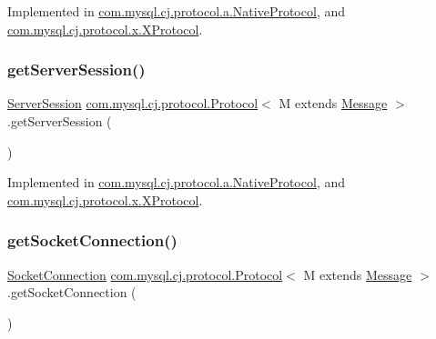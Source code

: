 Implemented in \mbox{\hyperlink{classcom_1_1mysql_1_1cj_1_1protocol_1_1a_1_1_native_protocol_a6bb695c2fd2b3492490208c56b23ebd4}{com.\+mysql.\+cj.\+protocol.\+a.\+Native\+Protocol}}, and \mbox{\hyperlink{classcom_1_1mysql_1_1cj_1_1protocol_1_1x_1_1_x_protocol_a42d0005d5123c6c54913d499ab69fbf5}{com.\+mysql.\+cj.\+protocol.\+x.\+X\+Protocol}}.

\mbox{\label{interfacecom_1_1mysql_1_1cj_1_1protocol_1_1_protocol_a1dade0f0b8da9ec87055ff8b86323bd3}} 
\subsubsection{\texorpdfstring{get\+Server\+Session()}{getServerSession()}}
{\footnotesize\ttfamily \mbox{\hyperlink{interfacecom_1_1mysql_1_1cj_1_1protocol_1_1_server_session}{Server\+Session}} \mbox{\hyperlink{interfacecom_1_1mysql_1_1cj_1_1protocol_1_1_protocol}{com.\+mysql.\+cj.\+protocol.\+Protocol}}$<$ M extends \mbox{\hyperlink{interfacecom_1_1mysql_1_1cj_1_1protocol_1_1_message}{Message}} $>$.get\+Server\+Session (\begin{DoxyParamCaption}{ }\end{DoxyParamCaption})}



Implemented in \mbox{\hyperlink{classcom_1_1mysql_1_1cj_1_1protocol_1_1a_1_1_native_protocol_a160dda876f487328e007c9c96b155c6b}{com.\+mysql.\+cj.\+protocol.\+a.\+Native\+Protocol}}, and \mbox{\hyperlink{classcom_1_1mysql_1_1cj_1_1protocol_1_1x_1_1_x_protocol_a856b079958623feb6f650c796082839e}{com.\+mysql.\+cj.\+protocol.\+x.\+X\+Protocol}}.

\mbox{\label{interfacecom_1_1mysql_1_1cj_1_1protocol_1_1_protocol_aacade9d5c60b79758ba4d55f6b7d886e}} 
\subsubsection{\texorpdfstring{get\+Socket\+Connection()}{getSocketConnection()}}
{\footnotesize\ttfamily \mbox{\hyperlink{interfacecom_1_1mysql_1_1cj_1_1protocol_1_1_socket_connection}{Socket\+Connection}} \mbox{\hyperlink{interfacecom_1_1mysql_1_1cj_1_1protocol_1_1_protocol}{com.\+mysql.\+cj.\+protocol.\+Protocol}}$<$ M extends \mbox{\hyperlink{interfacecom_1_1mysql_1_1cj_1_1protocol_1_1_message}{Message}} $>$.get\+Socket\+Connection (\begin{DoxyParamCaption}{ }\end{DoxyParamCaption})}

